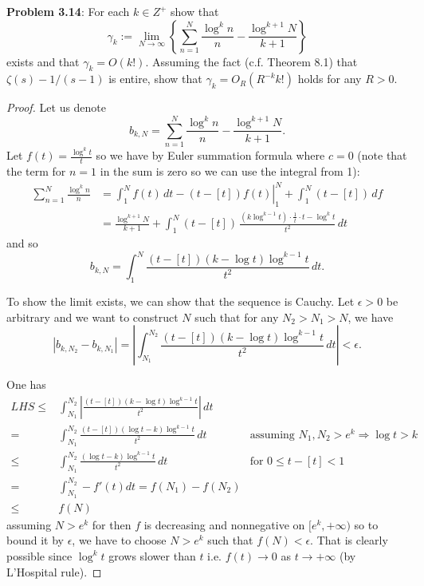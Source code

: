 \documentclass{article}
\newcommand{\Abs}[1]{\left| #1 \right|}
\begin{document}
\fi

\textbf{Problem 3.14}: For each $k \in Z^+$ show that
$$\gamma_k := \lim_{N \rightarrow \infty} \left\{ \sum_{n=1}^{N} \frac{\log^k n}{n} -  \frac{\log^{k+1} N}{k+1} \right\}$$
exists and that $\gamma_k = O(k!)$. Assuming the fact (c.f. Theorem 8.1) that $\zeta(s) - 1/(s-1)$ is entire, show that $\gamma_k = O_R(R^{-k} k!)$ holds for any $R > 0$.

\begin{proof}
Let us denote
$$b_{k,N} = \sum_{n=1}^{N} \frac{\log^k n}{n} -  \frac{\log^{k+1} N}{k+1}.$$
Let $f(t) = \frac{\log^k t}{t}$ so we have by Euler summation formula where $c = 0$ (note that the term for $n = 1$ in the sum is zero so we can use the integral from 1):
\begin{align*}
\sum_{n=1}^{N} \frac{\log^k n}{n} &= \left. \int_1^N f(t) \, dt - (t - [t]) f(t) \right|_1^N + \int_1^N (t - [t]) \, df\\
&= \frac{\log^{k+1} N}{k+1} + \int_1^N (t - [t]) \, \frac{(k \log^{k-1} t) \cdot \frac 1t \cdot t - \log^k t}{t^2} \, dt
\end{align*}
and so
$$b_{k,N} = \int_1^N \frac{(t - [t]) (k - \log t) \log^{k-1} t}{t^2} \, dt.$$

To show the limit exists, we can show that the sequence is Cauchy. Let $\epsilon > 0$ be arbitrary and we want to construct $N$ such that for any $N_2 > N_1 > N$, we have
$$\Abs{b_{k,N_2} - b_{k,N_1}} = \Abs{ \int_{N_1}^{N_2} \frac{(t - [t]) (k - \log t) \log^{k-1} t}{t^2} \, dt } < \epsilon.$$

One has
\begin{align*}
LHS \leq&\int_{N_1}^{N_2} \Abs{ \frac{(t - [t]) (k - \log t) \log^{k-1} t}{t^2} } \, dt\\
=& \int_{N_1}^{N_2} \frac{(t - [t]) (\log t - k) \log^{k-1} t}{t^2} \, dt &\text{assuming } N_1, N_2 > e^k \Rightarrow \log t > k\\
\leq& \int_{N_1}^{N_2} \frac{(\log t - k) \log^{k-1} t}{t^2} \, dt & \text{for } 0 \leq t - [t] < 1\\
=& \int_{N_1}^{N_2} - f'(t) dt = f(N_1) - f(N_2)\\
\leq& f(N)
\end{align*}
assuming $N > e^k$ for then $f$ is decreasing and nonnegative on $[e^k, +\infty)$ so to bound it by $\epsilon$, we have to choose $N > e^k$ such that $f(N) < \epsilon$. That is clearly possible since $\log^k t$ grows slower than $t$ i.e. $f(t) \rightarrow 0$ as $t \rightarrow +\infty$ (by L'Hospital rule).


\end{proof}
\end{document}
